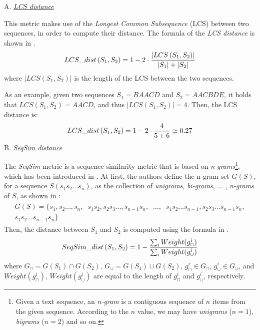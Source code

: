 \vspace{10pt}
\noindent
A. \textit{\underline{LCS distance}}
\vspace{5pt}

This metric makes use of the \textit{Longest Common Subsequence} (LCS) between two sequences, in order to compute their distance. The formula of the \textit{LCS distance} is shown in .
%
\begin{align}
 \label{eq:lcs-distance}
 \centering
  LCS\_dist\left( S_1, S_2 \right) = 
  1 - 2\cdot\frac{ \left| LCS\left( S_1, S_2 \right) \right|}
       {\left| S_1 \right| + \left| S_2 \right|}
\end{align}
%
where $\left|LCS\left( S_1, S_2 \right) \right|$ is the length of the LCS between the two sequences.

As an example, given two sequences $S_1 = BAACD$ and $S_2 = AACBDE$, it holds that $LCS(S_1,S_2) = AACD$, and thus $\left|LCS\left( S_1, S_2 \right) \right| = 4$. Then, the LCS distance is:
%
\begin{align*}
 \centering
  LCS\_dist\left( S_1, S_2 \right) = 
  1 - 2\cdot\frac{ 4}
       {5 + 6} \simeq 0.27
\end{align*}
%
\vspace{10pt}
\noindent
B. \textit{\underline{SeqSim distance}}
\vspace{-2pt}

The \textit{SeqSim} metric is a sequence similarity metric that is based on \textit{n-grams}\footnote{Given a text sequence, an \textit{n-gram} is a contiguous sequence of $n$ items from the given sequence. According to the $n$ value, we may have \textit{unigrams} ($n=1$), \textit{bigrams} ($n=2$) and so on.}, which has been introduced in \cite{Wang:2013}. At first, the authors define the n-gram set $G(S)$, for a sequence $S(s_1s_2 ... s_n)$, as the collection of \textit{unigrams}, \textit{bi-grams}, ... , \textit{n-grams} of $S$, as shown in :
%
\begin{align}
 \label{eq:n-grams}
  \begin{split}
    G(S) = 
    \lbrace s_1,s_2 ..., s_n,\;\; s_1s_2, s_2s_3 ..., s_{n-1}s_n,\;\; ...,\;\; s_1s_2...s_{n-1}, s_2s_3...s_{n-1}s_n, \\
    s_1s_2...s_{n-1}s_n\rbrace
  \end{split}
\end{align}
%
Then, the distance between $S_1$ and $S_2$ is computed using the formula in .
%
\begin{equation}
 \label{eq:seqsim}
 \centering
  SeqSim\_dist\left( S_1, S_2 \right) = 
  1 - \frac{ \sum_{i} Weight(g_\cap^{i}) }
       { \sum_{i} Weight(g_\cup^{i}) }
\end{equation}
%
where $G_\cap = G(S_1)\cap G(S_2)$, $G_\cup = G(S_1)\cup G(S_2)$, $g_\cap^{i} \in G_\cap$, $g_\cup^{i} \in G_\cup$, and\\$Weight(g_\cap^{i})$, $Weight(g_\cup^{i})$ are equal to the length of $g_\cap^{i}$ and $g_\cup^{i}$, respectively.


